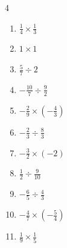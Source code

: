 \begin{multicols}{4}
\begin{enumerate}

  \item $\displaystyle \frac{1}{4}\times{}\frac{1}{3}$


  \item $\displaystyle 1\times{}1$

        \phantom{$\displaystyle =1$}

  \item $\displaystyle \frac{5}{7}\div{}2$


  \item $\displaystyle -\frac{10}{7}\div{}\frac{9}{2}$


  \item $\displaystyle -\frac{2}{9}\times{}\left(-\frac{4}{3}\right)$


\columnbreak %

  \item $\displaystyle -\frac{2}{3}\div{}\frac{8}{3}$


  \item $\displaystyle -\frac{3}{2}\times{}\left(-2\right)$

        \phantom{$\displaystyle =3$}

  \item $\displaystyle \frac{1}{2}\div{}\frac{9}{10}$


  \item $\displaystyle -\frac{6}{5}\div{}\frac{4}{3}$


  \item $\displaystyle -\frac{4}{7}\times{}\left(-\frac{5}{4}\right)$


  \item $\displaystyle \frac{1}{9}\times{}\frac{1}{5}$



\end{enumerate}
\end{multicols}
